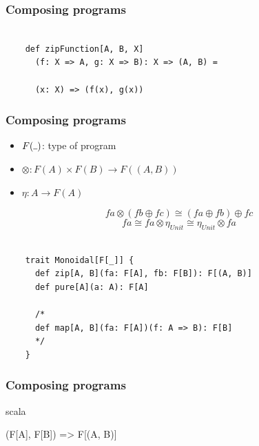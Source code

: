 \documentclass{beamer}
\newcommand{\gpause}{\vspace*{-\baselineskip}\pause}
\begin{document}
\begin{frame}[fragile]

  \frametitle{Composing programs}

  \begin{verbatim}

    def zipFunction[A, B, X]
      (f: X => A, g: X => B): X => (A, B) =

      (x: X) => (f(x), g(x))

  \end{verbatim}

\end{frame}

\begin{frame}[fragile]

  \frametitle{Composing programs}
  \large

  \begin{itemize}
    \item $F(\rule{1ex}{.4pt})$: type of program \pause
    \item $\otimes: F(A) \times F(B) \rightarrow F((A, B))$ \pause
    \item $\eta: A \rightarrow F(A)$ \pause
  \end{itemize}

  $$fa \otimes (fb \oplus fc) \cong (fa \oplus fb) \oplus fc$$ \gpause
  $$fa \cong fa \otimes \eta_{Unit} \cong \eta_{Unit} \otimes fa$$

\end{frame}

\begin{frame}[fragile]

  \begin{verbatim}

    trait Monoidal[F[_]] {
      def zip[A, B](fa: F[A], fb: F[B]): F[(A, B)]
      def pure[A](a: A): F[A]

      /*
      def map[A, B](fa: F[A])(f: A => B): F[B]
      */
    }

  \end{verbatim}

\end{frame}

\begin{frame}[fragile]

  \frametitle{Composing programs}

  \centering
  \Large

  \begin{cminted}{scala}

(F[A], F[B]) => F[(A, B)]

  \end{cminted}

\end{frame}
\end{document}
